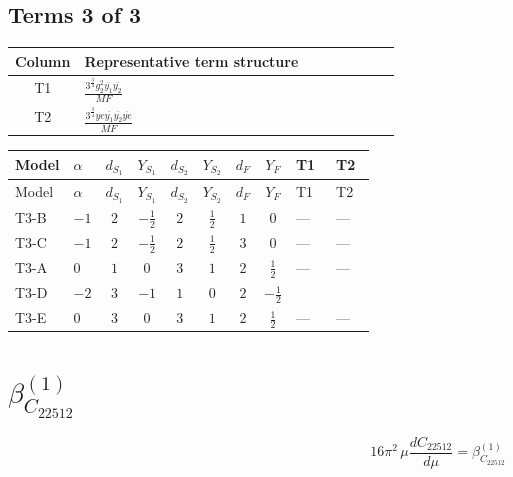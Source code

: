 \documentclass[8pt]{article}
\begin{document}
\begin{landscape}
\subsection*{Terms 3 of 3}
\begin{center}
\begin{tabular}{@{}c >{\raggedright\arraybackslash}p{0.82\linewidth}@{}}
\toprule
Column & Representative term structure \\
\midrule
T1 & \(\displaystyle \frac{3^{\frac{3}{4}} g_{2}^{2} \overline{y_{1}} \overline{y_{2}}}{MF}\) \\
\midrule
T2 & \(\displaystyle \frac{3^{\frac{3}{4}} ye \overline{y_{1}} \overline{y_{2}} \overline{ye}}{MF}\) \\
\midrule
\bottomrule
\end{tabular}
\end{center}
\smallskip
\tiny
\begin{longtable}{@{}llcccccc >{\raggedright\arraybackslash}p{0.21\linewidth} >{\raggedright\arraybackslash}p{0.21\linewidth}@{}}
\toprule
Model & $\alpha$ & $d_{S_1}$ & $Y_{S_1}$ & $d_{S_2}$ & $Y_{S_2}$ & $d_F$ & $Y_F$ & T1 & T2 \\
\midrule
\endfirsthead
\toprule
Model & $\alpha$ & $d_{S_1}$ & $Y_{S_1}$ & $d_{S_2}$ & $Y_{S_2}$ & $d_F$ & $Y_F$ & T1 & T2 \\
\midrule
\endhead
T3-B & $-1$ & $2$ & $-\frac{1}{2}$ & $2$ & $\frac{1}{2}$ & $1$ & $0$ & --- & --- \\
\midrule
T3-C & $-1$ & $2$ & $-\frac{1}{2}$ & $2$ & $\frac{1}{2}$ & $3$ & $0$ & --- & --- \\
\midrule
T3-A & $0$ & $1$ & $0$ & $3$ & $1$ & $2$ & $\frac{1}{2}$ & --- & --- \\
\midrule
T3-D & $-2$ & $3$ & $-1$ & $1$ & $0$ & $2$ & $-\frac{1}{2}$ & \scriptsize\adjustbox{max width=\linewidth}{$\begin{gathered} \frac{11 \cdot 3^{\frac{3}{4}} g_{2}^{2} \overline{y_{1}} \overline{y_{2}}}{8 MF}\end{gathered}$} & \scriptsize\adjustbox{max width=\linewidth}{$\begin{gathered} - \frac{3^{\frac{3}{4}} ye \overline{y_{1}} \overline{y_{2}} \overline{ye}}{12 MF}\end{gathered}$} \\
\midrule
T3-E & $0$ & $3$ & $0$ & $3$ & $1$ & $2$ & $\frac{1}{2}$ & --- & --- \\
\midrule
\bottomrule
\end{longtable}
\clearpage
\section*{$\beta_{C_{22512}}^{(1)}$}
\[16\pi^2\,\mu\frac{d C_{22512}}{d\mu}=\beta_{C_{22512}}^{(1)}\]

\end{landscape}
\end{document}
